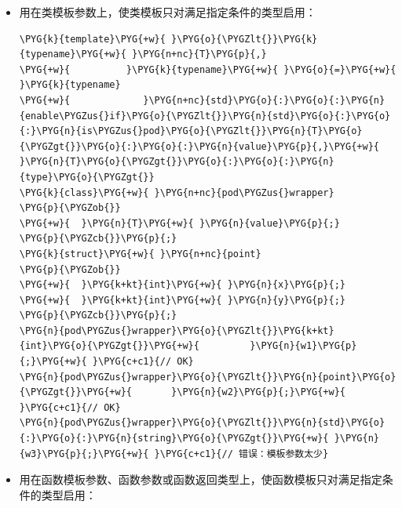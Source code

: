 \begin{itemize}
\item 用在类模板参数上，使类模板只对满足指定条件的类型启用：



\begin{codeblockbg}
\begin{Verbatim}[commandchars=\\\{\},breaklines=true,breakanywhere=true,fontsize=\codefont,xleftmargin=17bp]
\PYG{k}{template}\PYG{+w}{ }\PYG{o}{\PYGZlt{}}\PYG{k}{typename}\PYG{+w}{ }\PYG{n+nc}{T}\PYG{p}{,}
\PYG{+w}{          }\PYG{k}{typename}\PYG{+w}{ }\PYG{o}{=}\PYG{+w}{ }\PYG{k}{typename}
\PYG{+w}{             }\PYG{n+nc}{std}\PYG{o}{:}\PYG{o}{:}\PYG{n}{enable\PYGZus{}if}\PYG{o}{\PYGZlt{}}\PYG{n}{std}\PYG{o}{:}\PYG{o}{:}\PYG{n}{is\PYGZus{}pod}\PYG{o}{\PYGZlt{}}\PYG{n}{T}\PYG{o}{\PYGZgt{}}\PYG{o}{:}\PYG{o}{:}\PYG{n}{value}\PYG{p}{,}\PYG{+w}{ }\PYG{n}{T}\PYG{o}{\PYGZgt{}}\PYG{o}{:}\PYG{o}{:}\PYG{n}{type}\PYG{o}{\PYGZgt{}}
\PYG{k}{class}\PYG{+w}{ }\PYG{n+nc}{pod\PYGZus{}wrapper}
\PYG{p}{\PYGZob{}}
\PYG{+w}{  }\PYG{n}{T}\PYG{+w}{ }\PYG{n}{value}\PYG{p}{;}
\PYG{p}{\PYGZcb{}}\PYG{p}{;}
\PYG{k}{struct}\PYG{+w}{ }\PYG{n+nc}{point}
\PYG{p}{\PYGZob{}}
\PYG{+w}{  }\PYG{k+kt}{int}\PYG{+w}{ }\PYG{n}{x}\PYG{p}{;}
\PYG{+w}{  }\PYG{k+kt}{int}\PYG{+w}{ }\PYG{n}{y}\PYG{p}{;}
\PYG{p}{\PYGZcb{}}\PYG{p}{;}
\PYG{n}{pod\PYGZus{}wrapper}\PYG{o}{\PYGZlt{}}\PYG{k+kt}{int}\PYG{o}{\PYGZgt{}}\PYG{+w}{         }\PYG{n}{w1}\PYG{p}{;}\PYG{+w}{ }\PYG{c+c1}{// OK}
\PYG{n}{pod\PYGZus{}wrapper}\PYG{o}{\PYGZlt{}}\PYG{n}{point}\PYG{o}{\PYGZgt{}}\PYG{+w}{       }\PYG{n}{w2}\PYG{p}{;}\PYG{+w}{ }\PYG{c+c1}{// OK}
\PYG{n}{pod\PYGZus{}wrapper}\PYG{o}{\PYGZlt{}}\PYG{n}{std}\PYG{o}{:}\PYG{o}{:}\PYG{n}{string}\PYG{o}{\PYGZgt{}}\PYG{+w}{ }\PYG{n}{w3}\PYG{p}{;}\PYG{+w}{ }\PYG{c+c1}{// 错误：模板参数太少}
\end{Verbatim}
\end{codeblockbg}



\item 用在函数模板参数、函数参数或函数返回类型上，使函数模板只对满足指定条件的类型启用：




\end{itemize}
